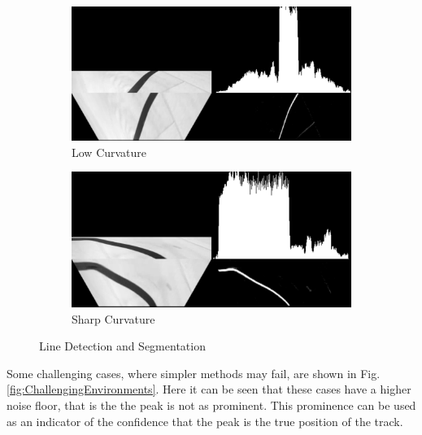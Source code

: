         \begin{figure}[H]
            \centering
            \begin{subfigure}[b]{0.45\textwidth}
                \includegraphics[width=\textwidth]{visionpipeline/vizSmallCurve.png}
                \caption{Low Curvature}
                \label{fig:LineDetection}
            \end{subfigure}
            \hfill
            \begin{subfigure}[b]{0.45\textwidth}
                \includegraphics[width=\textwidth]{visionpipeline/vizBigCurve.png}
                \caption{Sharp Curvature}
                \label{fig:Sharp Curvature}
            \end{subfigure}
            \caption{Line Detection and Segmentation}   
            \label{fig:Line Detection and Segmentation}
        \end{figure}
        
        Some challenging cases, where simpler methods may fail, are shown in 
        Fig.\ref{fig:ChallengingEnvironments}. Here it can be seen that these cases have a higher noise floor, 
        that is the the peak is not as prominent. This prominence can be used as an indicator of the confidence that 
        the peak is the true position of the track. 
       

